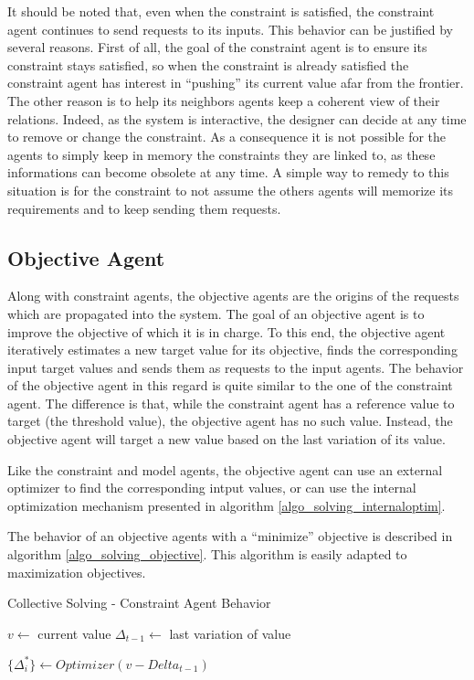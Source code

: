 It should be noted that, even when the constraint is satisfied, the constraint agent continues to send requests to its inputs. This behavior can be justified by several reasons.  First of all, the goal of the constraint agent is to ensure its constraint stays satisfied, so when the constraint is already  satisfied the constraint agent has interest in \enquote{pushing} its current value afar from the frontier.\\
The other reason is to help its neighbors agents keep a coherent view of their relations. Indeed, as the system is interactive, the designer can decide at any time to remove or change the constraint. As a consequence it is not possible for the agents to simply keep in memory the constraints they are linked to, as these informations can become obsolete at any time. A simple way to remedy to this situation is for the constraint to not assume the others agents will memorize its requirements and to keep sending them requests.

\subsection{Objective Agent}

Along with constraint agents, the objective agents are the origins of the requests which are propagated into the system. The goal of an objective agent is to improve the objective of which it is in charge. To this end, the objective agent iteratively estimates a new target value for its objective, finds the corresponding input target values and sends them as requests to the input agents. The behavior of the objective agent in this regard is quite similar to the one of the constraint agent. The difference is that, while the constraint agent has a reference value to target (the threshold value), the objective agent has no such value. Instead, the objective agent will target a new value based on the last variation of its value.

Like the constraint and model agents, the objective agent can use an external optimizer to find the corresponding intput values, or can use the internal optimization mechanism presented in algorithm \ref{algo_solving_internaloptim}.

The behavior of an objective agents with a \enquote{minimize} objective is described in algorithm \ref{algo_solving_objective}. This algorithm is easily adapted to maximization objectives.

\begin{algorithm}
\caption{Collective Solving - Constraint Agent Behavior}
\label{algo_solving_objective}

$v \leftarrow $ current value\;
$\Delta_{t-1} \leftarrow $ last variation of value \;

\BlankLine
$\{ \Delta^*_i \} \leftarrow Optimizer(v - Delta_{t-1})$\;
	
\end{algorithm}

